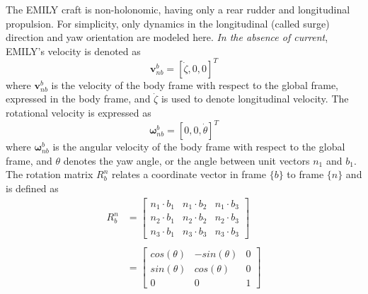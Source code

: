 \documentclass[conference]{IEEEtran}
\newcommand{\incomplete}{\framebox{\textbf{fill this in}}}
\begin{document}
The EMILY craft is non-holonomic, having only a rear rudder and longitudinal propulsion. For simplicity, only dynamics in the longitudinal (called surge) direction and yaw orientation are modeled here. \textit{In the absence of current}, EMILY's velocity is denoted as
\begin{equation}
  \bm{v}_{nb}^b = [\dot{\zeta}, 0, 0]^T
\end{equation}
where $\bm{v}_{nb}^b$ is the velocity of the body frame with respect to the global frame, expressed in the body frame, and $\dot{\zeta}$ is used to denote longitudinal velocity. The rotational velocity is expressed as
\begin{equation}
  \bm{\omega}_{nb}^b = [0, 0, \dot{\theta}]^T
\end{equation}
where $\bm{\omega}_{nb}^b$ is the angular velocity of the body frame with respect to the global frame, and $\theta$ denotes the yaw angle, or the angle between unit vectors $n_1$ and $b_1$. The rotation matrix $R_b^n$ relates a coordinate vector in frame $\{b\}$ to frame $\{n\}$ and is defined as
\begin{align}
  R_b^n &= 
  \begin{bmatrix}
    n_1 \cdot b_1   &   n_1 \cdot b_2   &   n_1 \cdot b_3 \\
    n_2 \cdot b_1   &   n_2 \cdot b_2   &   n_2 \cdot b_3 \\
    n_3 \cdot b_1   &   n_3 \cdot b_3   &   n_3 \cdot b_3
  \end{bmatrix} \nonumber \\ \nonumber \\
  &=
  \begin{bmatrix}
    cos(\theta)   &   -sin(\theta)  &   0 \\
    sin(\theta)   &   cos(\theta)   &   0 \\
    0   &   0   &   1
  \end{bmatrix}
\end{align}
\end{document}
